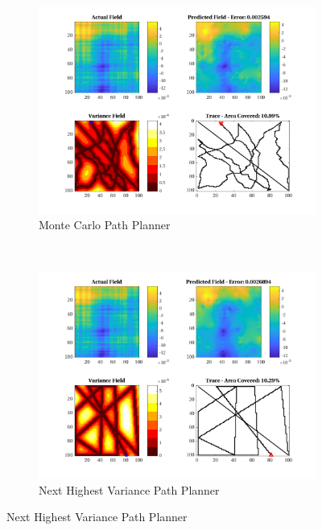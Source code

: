 \begin{figure}[htb!]
    \centering
    \begin{subfigure}[t]{0.5\textwidth}
        \centering
        \includegraphics[width=\linewidth]{figures/hbresults/mc_10p_100x100_sf_100_seed_3.png}
        \captionsetup{skip=0.10\baselineskip,size=footnotesize}
        \caption{Monte Carlo Path Planner}
    \end{subfigure}%
    ~ 
    \begin{subfigure}[t]{0.5\textwidth}
        \centering
        \includegraphics[width=\linewidth]{figures/hbresults/nhv_10p_100x100_sf_100_seed_3.png}
        \captionsetup{skip=0.10\baselineskip,size=footnotesize}
        \caption{Next Highest Variance Path Planner}

\end{subfigure}
\end{figure}
